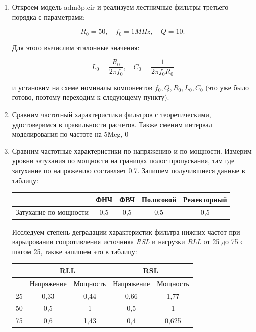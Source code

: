 \documentclass[a4paper, 12pt]{article}%
\begin{document}
\begin{enumerate}

\item Откроем модель adm3p.cir и реализуем лестничные фильтры третьего порядка с параметрами:

\[R_0 = 50, \quad f_0 = 1MHz, \quad Q = 10.\]

Для этого вычислим эталонные значения:

\[L_0 = \frac{R_0}{2\pi f_0}, \quad C_0 = \frac{1}{2 \pi f_0 R_0}\]

и установим на схеме номиналы компонентов $f_0, Q, R_0, L_0, C_0$ (это уже было готово, поэтому переходим к следующему пункту).

\item Сравним частотный характеристики фильтров с теоретическими, удостоверимся в правильности расчетов. Также сменим интервал моделирования по частоте на 5Meg, 0

\item Сравним частотные характеристики по напряжению и по мощности. Измерим уровни затухания по мощности на границах полос пропускания, там где затухание по напряжению составляет 0.7. Запишем получившиеся данные в таблицу:

\begin{center}
\begin{tabular}{|c|c|c|c|c|}
\hline 
 & ФНЧ & ФВЧ & Полосовой & Режекторный \\ 
\hline 
Затухание по мощности & 0,5 & 0,5 & 0,5 & 0,5 \\ 
\hline 
\end{tabular} 
\end{center}

Исследуем степень деградации характеристик фильтра нижних частот при варьировании сопротивления источника \textit{RSL} и нагрузки \textit{RLL} от 25 до 75 с шагом 25, также запишем это в таблицу:

\begin{center}
\begin{tabular}{|c|c|c|c|c|}
\hline 
 & \multicolumn{2}{c|}{RLL} & \multicolumn{2}{c|}{RSL} \\ 
\hline 
 & Напряжение & Мощность & Напряжение & Мощность \\ 
\hline 
25 & 0,33 & 0,44 & 0,66 & 1,77 \\ 
\hline 
50 & 0,5 & 1 & 0,5 & 1 \\ 
\hline 
75 & 0,6 & 1,43 & 0,4 & 0,625 \\ 
\hline 
\end{tabular} 
\end{center}


\end{enumerate}
\end{document}
